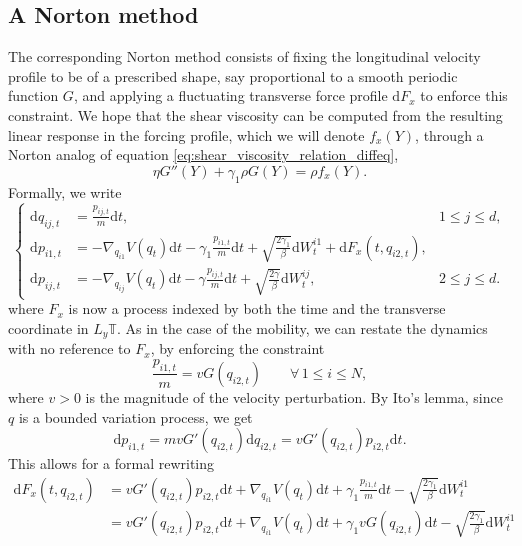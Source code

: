\documentclass[a4paper,10pt,twoside,leqno]{report}
\renewcommand{\leq}{\leqslant}
\newcommand{\dif}{\mathrm{d}}
\newcommand{\1}{\mathbbm{1}}
\begin{document}
    \subsection{A Norton method}
    The corresponding Norton method consists of fixing the longitudinal velocity profile to be of a prescribed shape, say proportional to a smooth periodic function $G$, and applying a 
    fluctuating transverse force profile $\dif F_x$ to enforce this constraint. We hope that the shear viscosity can be computed from the resulting linear response in the forcing profile, which we will denote $f_x(Y)$, through a Norton analog of equation \eqref{eq:shear_viscosity_relation_diffeq},
    \begin{equation}
        \label{eq:shear_viscosity_relation_norton}
        \eta G''(Y)+\gamma_1 \rho G(Y)=\rho f_x(Y).
    \end{equation}
    Formally, we write
    \begin{equation}
        \left\{\begin{aligned}
            \dif q_{ij,t}&=\frac{p_{ij,t}}m\dif t,&1\leq j\leq d,\\
            \dif p_{i1,t}&=-\nabla_{q_{i1}}V(q_t)\dif t-\gamma_1\frac{p_{i1,t}}m\dif t+\sqrt{\frac{2\gamma_1}\beta}\dif W_t^{i1}+\dif F_x\left(t,q_{i2,t}\right),&\\
            \dif p_{ij,t}&=-\nabla_{q_{ij}}V(q_t)\dif t-\gamma \frac{p_{ij,t}}m\dif t+\sqrt{\frac{2\gamma}\beta}\dif W_t^{ij},&2\leq j\leq d.
        \end{aligned}\right.
    \end{equation}
    where $F_x$ is now a process indexed by both the time and the transverse coordinate in $L_y \mathbb T$.
    As in the case of the mobility, we can restate the dynamics with no reference to $F_x$, by enforcing the constraint
    \begin{equation}
        \label{eq:norton_shear_viscosity_constraint}
        \frac{p_{i1,t}}m=vG\left(q_{i2,t}\right)\qquad \forall\, 1\leq i\leq N,
    \end{equation}
    where $v>0$ is the magnitude of the velocity perturbation.
    By Ito's lemma, since $q$ is a bounded variation process, we get
    \[\dif{p_{i1,t}}=mvG'\left(q_{i2,t}\right)\dif q_{i2,t}=vG'\left(q_{i2,t}\right)p_{i2,t}\dif t.\]
    This allows for a formal rewriting 
    \begin{equation}\label{eq:norton_sv_multiplier}
        \begin{aligned}
            \dif F_x\left(t,q_{i2,t}\right)&= vG'\left(q_{i2,t}\right)p_{i2,t}\dif t+\nabla_{q_{i1}}V(q_t)\dif t+\gamma_1\frac{p_{i1,t}}m\dif t-\sqrt{\frac{2\gamma_1}\beta}\dif W_t^{i1}\\
            &=vG'\left(q_{i2,t}\right)p_{i2,t}\dif t+\nabla_{q_{i1}}V(q_t)\dif t+\gamma_1vG\left(q_{i2,t}\right)\dif t-\sqrt{\frac{2\gamma_1}\beta}\dif W_t^{i1}
        \end{aligned}
    \end{equation}
\end{document}
